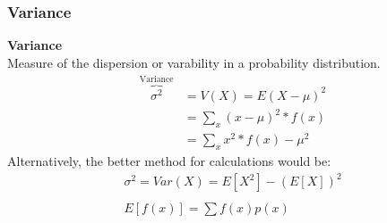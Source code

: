 \documentclass[../INDE315.tex]{subfiles}
\begin{document}
\subsubsection*{Variance}
\begin{defn}
    \textbf{Variance} \\
    Measure of the dispersion or varability in a probability distribution.
    \begin{equation*}
        \begin{aligned}
            \overbrace{\sigma ^2}^{\text{Variance}} &= V(X) = E(X - \mu)^2 \\
                                                &= \sum_x (x- \mu)^2 * f(x) \\
                                                &= \sum_x x^2 * f(x) - \mu ^2 
        \end{aligned}
    \end{equation*}
    Alternatively, the better method for calculations would be:
    \begin{equation*}
        \begin{aligned}
            \sigma ^2 =  Var(X) = E[X^2] - (E[X])^2 \\
            \\
            E[f(x)] = \sum f(x) p(x) 
        \end{aligned}
    \end{equation*}
\end{defn}
\end{document}

